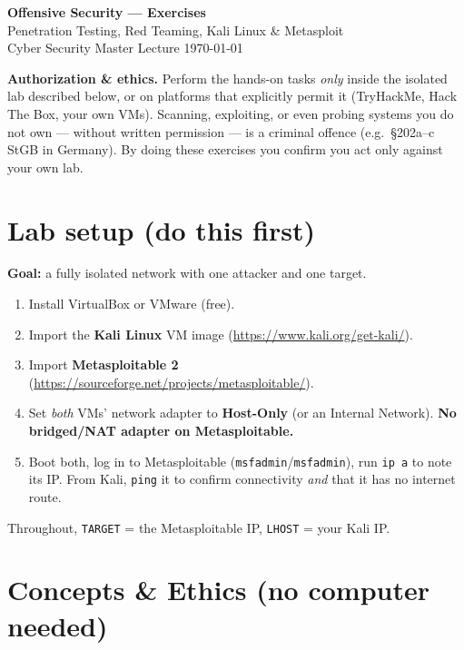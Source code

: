 \documentclass[11pt,a4paper]{article}
\begin{document}
\begin{center}
  {\LARGE\bfseries Offensive Security --- Exercises}\\[0.4em]
  {\large Penetration Testing, Red Teaming, Kali Linux \& Metasploit}\\[0.4em]
  Cyber Security Master Lecture \hfill \today
\end{center}
\vspace{0.5em}

\begin{warn}
\textbf{Authorization \& ethics.} Perform the hands-on tasks \emph{only} inside
the isolated lab described below, or on platforms that explicitly permit it
(TryHackMe, Hack The Box, your own VMs). Scanning, exploiting, or even
probing systems you do not own --- without written permission --- is a criminal
offence (e.g.\ \S202a--c StGB in Germany). By doing these exercises you confirm
you act only against your own lab.
\end{warn}

\bigskip
\section*{Lab setup (do this first)}
\begin{lab}
\textbf{Goal:} a fully isolated network with one attacker and one target.
\begin{enumerate}[leftmargin=1.4em, itemsep=2pt]
  \item Install VirtualBox or VMware (free).
  \item Import the \textbf{Kali Linux} VM image
        (\url{https://www.kali.org/get-kali/}).
  \item Import \textbf{Metasploitable 2}
        (\url{https://sourceforge.net/projects/metasploitable/}).
  \item Set \emph{both} VMs' network adapter to \textbf{Host-Only} (or an
        Internal Network). \textbf{No bridged/NAT adapter on Metasploitable.}
  \item Boot both, log in to Metasploitable (\texttt{msfadmin}/\texttt{msfadmin}),
        run \texttt{ip a} to note its IP. From Kali, \texttt{ping} it to confirm
        connectivity \emph{and} that it has no internet route.
\end{enumerate}
Throughout, \texttt{TARGET} = the Metasploitable IP, \texttt{LHOST} = your Kali IP.
\end{lab}

\section{Concepts \& Ethics (no computer needed)}
\end{document}
